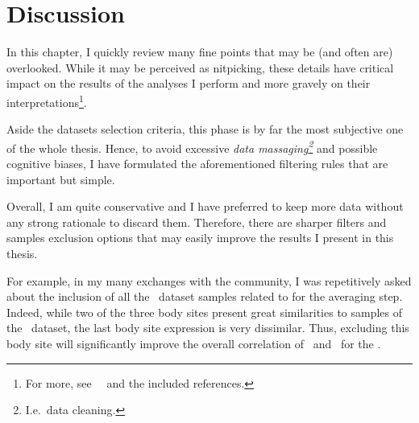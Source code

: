 \section{Discussion}

In this chapter, I quickly review many fine points that
may be (and often are) overlooked.
While it may be perceived as nitpicking,
these details have critical impact on the results of the analyses
I perform and more gravely on their interpretations\footnote{%
For more, see~~
and the included references.}.

Aside the datasets selection criteria,
this phase is by far the most subjective one of the whole thesis.
Hence, to avoid excessive \emph{data massaging\footnote{I.e.\ data cleaning.}}
and possible cognitive biases,
I have formulated the aforementioned filtering rules
that are important but simple.

Overall, I am quite conservative and I have preferred to keep more data
without any strong rationale to discard them.
Therefore, there are sharper filters and samples exclusion options that
may easily improve the results I present in this thesis.

For example, in my many exchanges with the community,
I was repetitively asked about the inclusion of all the \gtex\ dataset samples
related to  for the averaging step.
Indeed, while two of the three body sites present great similarities
to  samples of the \uhlen\ dataset,
the last body site expression is very dissimilar.
Thus, excluding this body site will significantly improve
the overall correlation of \gtex\ and \uhlen\ for the \Oesophagus.


